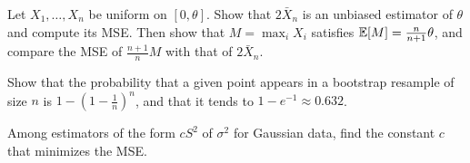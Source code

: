 \begin{notechapter}
\begin{exercise}\label{stats-and-proba:exr:2}
Let $X_1,\dots,X_n$ be uniform on $[0,\theta]$. Show that $2\bar X_n$ is an
unbiased estimator of $\theta$ and compute its MSE. Then show that
$M = \max_iX_i$ satisfies $\mathbb{E}[M] = \frac n{n+1}\theta$, and compare the MSE of
$\frac{n+1}nM$ with that of $2\bar X_n$.
\end{exercise}

\begin{exercise}\label{stats-and-proba:exr:3}
Show that the probability that a given point appears in a bootstrap resample of
size $n$ is $1 - (1 - \frac1n)^n$, and that it tends to $1 - e^{-1}\approx0.632$.
\end{exercise}

\begin{exercise}\label{stats-and-proba:exr:4}
Among estimators of the form $cS^2$ of $\sigma^2$ for Gaussian data, find the
constant $c$ that minimizes the MSE.
\end{exercise}
\end{notechapter}
